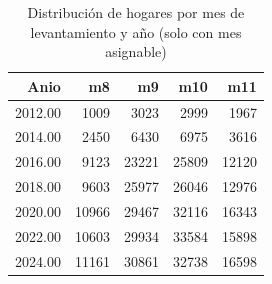 \begin{table}[ht]
\centering
\caption{Distribuci\'on de hogares por mes de levantamiento y a\~{n}o (solo con mes asignable)} 
\label{tab:07b_distribucion_mes}
\begin{tabular}{rrrrr}
  \toprule
Anio & m8 & m9 & m10 & m11 \\ 
  \midrule
2012.00 & 1009 & 3023 & 2999 & 1967 \\ 
  2014.00 & 2450 & 6430 & 6975 & 3616 \\ 
  2016.00 & 9123 & 23221 & 25809 & 12120 \\ 
  2018.00 & 9603 & 25977 & 26046 & 12976 \\ 
  2020.00 & 10966 & 29467 & 32116 & 16343 \\ 
  2022.00 & 10603 & 29934 & 33584 & 15898 \\ 
  2024.00 & 11161 & 30861 & 32738 & 16598 \\ 
   \bottomrule
\end{tabular}
\end{table}
